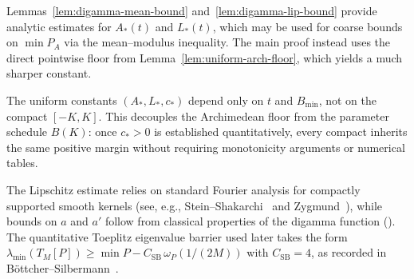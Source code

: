 \begin{remark}\label{rem:aux-mean-modulus}
Lemmas~\ref{lem:digamma-mean-bound} and~\ref{lem:digamma-lip-bound} provide analytic estimates for
$A_*(t)$ and $L_*(t)$, which may be used for coarse bounds on $\min P_A$
via the mean--modulus inequality.  The main proof instead uses the direct pointwise floor from
Lemma~\ref{lem:uniform-arch-floor}, which yields a much sharper constant.
\end{remark}

\begin{remark}\label{rem:uniform-vs-compact}
The uniform constants $(A_*, L_*, c_*)$ depend only on $t$ and $B_{\min}$, not on the compact $[-K,K]$.
This decouples the Archimedean floor from the parameter schedule $B(K)$: once $c_*>0$ is established quantitatively,
every compact inherits the same positive margin without requiring monotonicity arguments or numerical tables.
\end{remark}

\begin{remark}[References]
The Lipschitz estimate relies on standard Fourier analysis for compactly supported smooth kernels (see, e.g., Stein--Shakarchi~\cite[Ch.~2]{SteinShakarchi2003} and Zygmund~\cite[Ch.~I]{Zygmund2002}), while bounds on $a$ and $a'$ follow from classical properties of the digamma function (\cite[\S5.2]{NISTDLMF}).  The quantitative Toeplitz eigenvalue barrier used later takes the form $\lambda_{\min}(T_M[P])\ge\min P - C_{\mathrm{SB}}\,\omega_P(1/(2M))$ with $C_{\mathrm{SB}}=4$, as recorded in B\"ottcher--Silbermann~\cite[Ch.~5]{BoettcherSilbermann2006}.
\end{remark}
